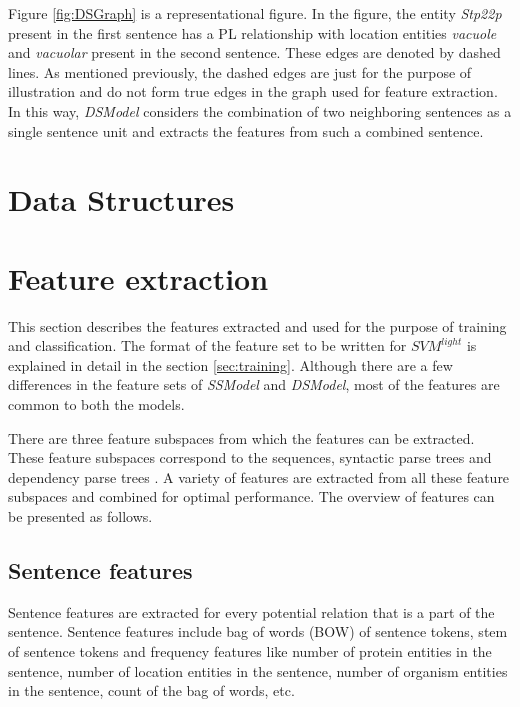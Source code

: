 Figure \ref{fig:DSGraph} is a representational figure. In the figure, the entity \textit{Stp22p} present in the first sentence has a PL relationship with location entities \textit{vacuole} and \textit{vacuolar} present in the second sentence. These edges are denoted by dashed lines. As mentioned previously, the dashed edges are just for the purpose of illustration and do not form true edges in the graph used for feature extraction. In this way, \textit{DSModel} considers the combination of two neighboring sentences as a single sentence unit and extracts the features from such a combined sentence.

\section{Data Structures} \label{sec:dataStructure}


\section{Feature extraction}\label{sec:featExp}

This section describes the features extracted and used for the purpose of training and classification. The format of the feature set to be written for $SVM^{light}$ is explained in detail in the section \ref{sec:training}. Although there are a few differences in the feature sets of \textit{SSModel} and \textit{DSModel}, most of the features are common to both the models. 

There are three feature subspaces from which the features can be extracted. These feature subspaces correspond to the sequences, syntactic parse trees and dependency parse trees \cite{jiang2007systematic}. A variety of features are extracted from all these feature subspaces and combined for optimal performance. The overview of features can be presented as follows.

\subsection*{Sentence features}

Sentence features are extracted for every potential relation that is a part of the sentence. Sentence features include bag of words (BOW) of sentence tokens, stem of sentence tokens and frequency features like number of protein entities in the sentence, number of location entities in the sentence, number of organism entities in the sentence, count of the bag of words, etc.

